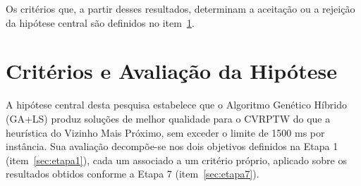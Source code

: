 Os critérios que, a partir desses resultados, determinam a aceitação ou a rejeição da
hipótese central são definidos no item~\ref{sec:criterios}.

\section{Critérios e Avaliação da Hipótese}
\label{sec:criterios}

A hipótese central desta pesquisa estabelece que o Algoritmo Genético Híbrido (GA+LS)
produz soluções de melhor qualidade para o CVRPTW do que a heurística do Vizinho Mais
Próximo, sem exceder o limite de 1500 ms por instância. Sua avaliação decompõe-se nos
dois objetivos definidos na Etapa 1 (item~\ref{sec:etapa1}), cada um associado a um
critério próprio, aplicado sobre os resultados obtidos conforme a Etapa 7
(item~\ref{sec:etapa7}).

